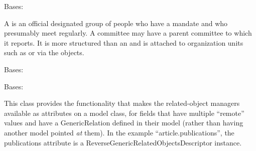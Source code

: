 \documentclass[letterpaper,10pt,english]{sphinxmanual}
\begin{document}
\begin{fulllineitems}
\label{generated/apps.reporting.models:apps.reporting.models.Committee}
Bases: 

A  is an official designated group of people who have a mandate and who
presumably meet regularly.  A committee may have a parent committee to which it reports.
It is more structured than an  and is attached to organization units
such as  or  via the  objects.


\begin{fulllineitems}
\label{generated/apps.reporting.models:apps.reporting.models.Committee.DoesNotExist}
Bases: 

\end{fulllineitems}



\begin{fulllineitems}
\label{generated/apps.reporting.models:apps.reporting.models.Committee.MultipleObjectsReturned}
Bases: 

\end{fulllineitems}



\begin{fulllineitems}
\label{generated/apps.reporting.models:apps.reporting.models.Committee.accept_invitation}
\end{fulllineitems}



\begin{fulllineitems}
\label{generated/apps.reporting.models:apps.reporting.models.Committee.affiliations}
This class provides the functionality that makes the related-object
managers available as attributes on a model class, for fields that have
multiple ``remote'' values and have a GenericRelation defined in their model
(rather than having another model pointed \emph{at} them). In the example
``article.publications'', the publications attribute is a
ReverseGenericRelatedObjectsDescriptor instance.


\end{fulllineitems}
\end{fulllineitems}
\end{document}
